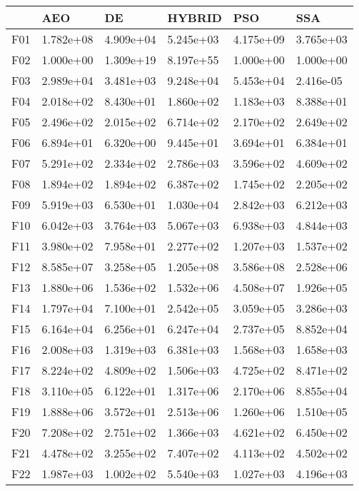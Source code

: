 \begin{tabular}{llllll}
\toprule
{} &        AEO &         DE &     HYBRID &        PSO &        SSA \\
\midrule
F01  &  1.782e+08 &  4.909e+04 &  5.245e+03 &  4.175e+09 &  3.765e+03 \\
F02  &  1.000e+00 &  1.309e+19 &  8.197e+55 &  1.000e+00 &  1.000e+00 \\
F03  &  2.989e+04 &  3.481e+03 &  9.248e+04 &  5.453e+04 &  2.416e-05 \\
F04  &  2.018e+02 &  8.430e+01 &  1.860e+02 &  1.183e+03 &  8.388e+01 \\
F05  &  2.496e+02 &  2.015e+02 &  6.714e+02 &  2.170e+02 &  2.649e+02 \\
F06  &  6.894e+01 &  6.320e+00 &  9.445e+01 &  3.694e+01 &  6.384e+01 \\
F07  &  5.291e+02 &  2.334e+02 &  2.786e+03 &  3.596e+02 &  4.609e+02 \\
F08  &  1.894e+02 &  1.894e+02 &  6.387e+02 &  1.745e+02 &  2.205e+02 \\
F09  &  5.919e+03 &  6.530e+01 &  1.030e+04 &  2.842e+03 &  6.212e+03 \\
F10  &  6.042e+03 &  3.764e+03 &  5.067e+03 &  6.938e+03 &  4.844e+03 \\
F11  &  3.980e+02 &  7.958e+01 &  2.277e+02 &  1.207e+03 &  1.537e+02 \\
F12  &  8.585e+07 &  3.258e+05 &  1.205e+08 &  3.586e+08 &  2.528e+06 \\
F13  &  1.880e+06 &  1.536e+02 &  1.532e+06 &  4.508e+07 &  1.926e+05 \\
F14  &  1.797e+04 &  7.100e+01 &  2.542e+05 &  3.059e+05 &  3.286e+03 \\
F15  &  6.164e+04 &  6.256e+01 &  6.247e+04 &  2.737e+05 &  8.852e+04 \\
F16  &  2.008e+03 &  1.319e+03 &  6.381e+03 &  1.568e+03 &  1.658e+03 \\
F17  &  8.224e+02 &  4.809e+02 &  1.506e+03 &  4.725e+02 &  8.471e+02 \\
F18  &  3.110e+05 &  6.122e+01 &  1.317e+06 &  2.170e+06 &  8.855e+04 \\
F19  &  1.888e+06 &  3.572e+01 &  2.513e+06 &  1.260e+06 &  1.510e+05 \\
F20  &  7.208e+02 &  2.751e+02 &  1.366e+03 &  4.621e+02 &  6.450e+02 \\
F21  &  4.478e+02 &  3.255e+02 &  7.407e+02 &  4.113e+02 &  4.502e+02 \\
F22  &  1.987e+03 &  1.002e+02 &  5.540e+03 &  1.027e+03 &  4.196e+03 \\

\end{tabular}
